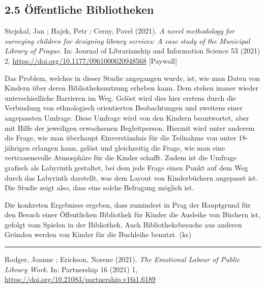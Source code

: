 \documentclass[a4paper,
fontsize=11pt,
oneside,
numbers=noperiodatend,
parskip=half-,
bibliography=totoc,
final
]{scrartcl}
\begin{document}
\hypertarget{uxf6ffentliche-bibliotheken}{%
\subsection{2.5 Öffentliche
Bibliotheken}\label{uxf6ffentliche-bibliotheken}}

Stejskal, Jan ; Hajek, Petr ; Cerny, Pavel (2021). \emph{A novel
methodology for surveying children for designing library services: A
case study of the Municipal Library of Prague}. In: Journal of
Librarianship and Information Science 53 (2021) 2,
\url{https://doi.org/10.1177/0961000620948568} {[}Paywall{]}

Das Problem, welches in dieser Studie angegangen wurde, ist, wie man
Daten von Kindern über deren Bibliotheksnutzung erheben kann. Dem stehen
immer wieder unterschiedliche Barrieren im Weg. Gelöst wird dies hier
erstens durch die Verbindung von ethnologisch orientierten Beobachtungen
und zweitens einer angepassten Umfrage. Diese Umfrage wird von den
Kindern beantwortet, aber mit Hilfe der jeweiligen erwachsenen
Begleitperson. Hiermit wird unter anderem die Frage, wie man überhaupt
Einverständnis für die Teilnahme von unter 18-jährigen erlangen kann,
gelöst und gleichzeitig die Frage, wie man eine vertrauensvolle
Atmosphäre für die Kinder schafft. Zudem ist die Umfrage grafisch als
Labyrinth gestaltet, bei dem jede Frage einen Punkt auf dem Weg durch
das Labyrinth darstellt, was dem Layout von Kinderbüchern angepasst ist.
Die Studie zeigt also, dass eine solche Befragung möglich ist.

Die konkreten Ergebnisse ergeben, dass zumindest in Prag der Hauptgrund
für den Besuch einer Öffentlichen Bibliothek für Kinder die Ausleihe von
Büchern ist, gefolgt vom Spielen in der Bibliothek. Auch
Bibliotheksbesuche aus anderen Gründen werden von Kinder für die
Buchleihe benutzt. (ks)

\begin{center}\rule{0.5\linewidth}{0.5pt}\end{center}

Rodger, Joanne ; Erickson, Norene (2021). \emph{The Emotional Labour of
Public Library Work}. In: Partnership 16 (2021) 1,
\url{https://doi.org/10.21083/partnership.v16i1.6189}
\end{document}
